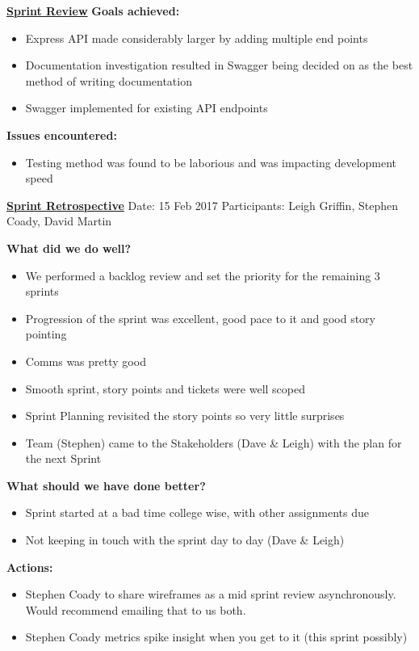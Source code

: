 \underline{\textbf{Sprint Review}}\newline
\textbf{Goals achieved:}
\begin{itemize}
	\item Express API made considerably larger by adding multiple end points
	\item Documentation investigation resulted in Swagger being decided on as the best method of writing documentation \citep{Swagger2017} 
	\item Swagger implemented for existing API endpoints
\end{itemize}

\textbf{Issues encountered:}
\begin{itemize}
	\item Testing method was found to be laborious and was impacting development speed
\end{itemize}

\underline{\textbf{Sprint Retrospective}}\newline
Date: 15 Feb 2017\newline
Participants: Leigh Griffin, Stephen Coady, David Martin

\textbf{What did we do well?}
\begin{itemize}
	\item We performed a backlog review and set the priority for the remaining 3 sprints
	\item Progression of the sprint was excellent, good pace to it and good story pointing
	\item Comms was pretty good
	\item Smooth sprint, story points and tickets were well scoped
	\item Sprint Planning revisited the story points so very little surprises
	\item Team (Stephen) came to the Stakeholders (Dave \& Leigh) with the plan for the next Sprint
\end{itemize}
\textbf{What should we have done better?}
\begin{itemize}
	\item Sprint started at a bad time college wise, with other assignments due
	\item Not keeping in touch with the sprint day to day (Dave \& Leigh)
\end{itemize}
\textbf{Actions:}
\begin{itemize}
	\item Stephen Coady to share wireframes as a mid sprint review asynchronously. Would recommend emailing that to us both.
	\item Stephen Coady metrics spike insight when you get to it (this sprint possibly)
\end{itemize}

